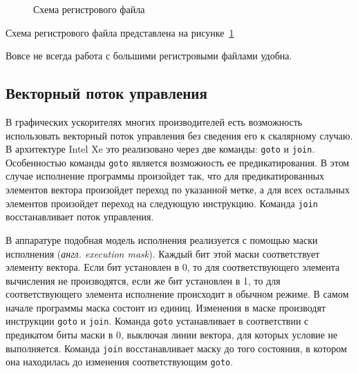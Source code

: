 \begin{figure}[ht]
    \caption{Схема регистрового файла}\label{fig:genisa-addressing-base}
\end{figure}

Схема регистрового файла представлена на рисунке~\cref{fig:genisa-addressing-base}

Вовсе не всегда работа с большими регистровыми файлами удобна.

\subsection{Векторный поток управления}\label{subsec:overview/logical/simdcf}

В графических ускорителях многих производителей есть возможность использовать векторный поток управления без сведения его к скалярному случаю. В архитектуре Intel Xe это реализовано через две команды: \texttt{goto} и \texttt{join}. Особенностью команды \texttt{goto} является возможность ее предикатирования. В этом случае исполнение программы произойдет так, что для предикатированных элементов вектора произойдет переход по указанной метке, а для всех остальных элементов произойдет переход на следующую инструкцию. Команда \texttt{join} восстанавливает поток управления.

В аппаратуре подобная модель исполнения реализуется с помощью маски исполнения (\textit{англ. execution mask}). Каждый бит этой маски соответствует элементу вектора. Если бит установлен в 0, то для соответствующего элемента вычисления не производятся, если же бит установлен в 1, то для соответствующего элемента исполнение происходит в обычном режиме. В самом начале программы маска состоит из единиц. Изменения в маске производят инструкции \texttt{goto} и \texttt{join}. Команда \texttt{goto} устанавливает в соответствии с предикатом биты маски в 0, выключая линии вектора, для которых условие не выполняется. Команда \texttt{join} восстанавливает маску до того состояния, в котором она находилась до изменения соответствующим \texttt{goto}.


